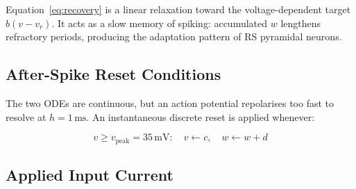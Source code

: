 \documentclass[conference]{IEEEtran}
\begin{document}
Equation~\eqref{eq:recovery} is a linear relaxation toward the voltage-dependent target
$b(v{-}v_r)$. It acts as a slow memory of spiking: accumulated $w$ lengthens refractory
periods, producing the adaptation pattern of RS pyramidal neurons.

\subsection{After-Spike Reset Conditions}
\label{sec:reset}

The two ODEs are continuous, but an action potential repolarises too fast to resolve at
$h = 1\,\text{ms}$. An instantaneous discrete reset is applied whenever:

\begin{equation}
  v \geq v_{\text{peak}} = 35\,\text{mV}:
  \quad v \leftarrow c, \quad w \leftarrow w + d
  \label{eq:reset}
\end{equation}

\begin{table}[htbp]
  \centering
  \caption{Reset Parameters -- Eq.\,\eqref{eq:reset}}
  \label{tab:reset}
\end{table}

\subsection{Applied Input Current}
\end{document}
